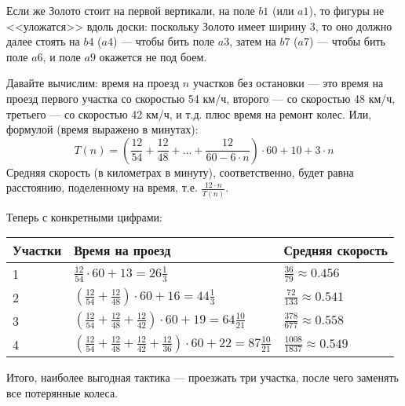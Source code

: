 \begin{itemize}
Если же Золото стоит на первой вертикали, на поле $b1$ (или $a1$), то фигуры не <<уложатся>> вдоль доски: 
поскольку Золото имеет ширину 3, то оно должно далее стоять на $b4$ ($a4$) --- чтобы бить поле $a3$, 
затем на $b7$ ($a7$) --- чтобы бить поле $a6$, и поле $a9$ окажется не под боем.

\begin{center}\end{center}


\itC Давайте вычислим: время на проезд $n$ участков без остановки --- 
это время на проезд первого участка 
со скоростью 54 км/ч, второго --- со скоростью 48 км/ч, третьего --- со скоростью 42 км/ч, и т.д.
плюс время на ремонт колес. Или, формулой (время выражено в минутах):
 $$T(n) = \left(\frac{12}{54} + \frac{12}{48} + \dots + \frac{12}{60 - 6 \cdot n}\right) \cdot 60 + 10 + 3 \cdot n$$
Средняя скорость (в километрах в минуту), соответственно, будет равна расстоянию, поделенному на время, т.е.
$\frac{12 \cdot n}{T(n)}$.

Теперь с конкретными цифрами:

\begin{tabular}{lll}
Участки & Время на проезд & Средняя скорость \\
\hline
1	& $\frac{12}{54} \cdot 60 + 13 = 26\frac{1}{3}$ & $\frac{36}{79} \approx 0.456$ \\
2	& $\left(\frac{12}{54} + \frac{12}{48}\right) \cdot 60 + 16 = 44\frac{1}{3}$ & $\frac{72}{133} \approx 0.541$ \\
3	& $\left(\frac{12}{54} + \frac{12}{48} + \frac{12}{42}\right) \cdot 60 + 19 = 64\frac{10}{21}$ & $\frac{378}{677} \approx 0.558$ \\
4	& $\left(\frac{12}{54} + \frac{12}{48} + \frac{12}{42} + \frac{12}{36}\right) \cdot 60 + 22 = 87\frac{10}{21}$ & $\frac{1008}{1837} \approx 0.549$
\end{tabular}

Итого, наиболее выгодная тактика --- проезжать три участка, после чего заменять все потерянные колеса.
\end{itemize}